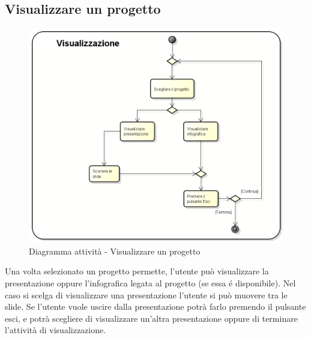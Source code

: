 \subsection{Visualizzare un progetto}
\begin{figure}[h] 
	\centering 
	\includegraphics[width=0.9\linewidth] {img/activity_visualizza.png}
	\caption{Diagramma attività - Visualizzare un progetto} 
\end{figure}
Una volta selezionato un progetto permette, l'utente può visualizzare la presentazione oppure l'\gls{infografica} legata al progetto (se essa é disponibile). Nel caso si scelga di visualizzare una presentazione l'utente si può muovere tra le \gls{slide}. Se l'utente vuole uscire dalla presentazione potrà farlo premendo il pulsante esci, e potrà scegliere di visualizzare un'altra presentazione oppure di terminare l'attività di visualizzazione.
\newpage


